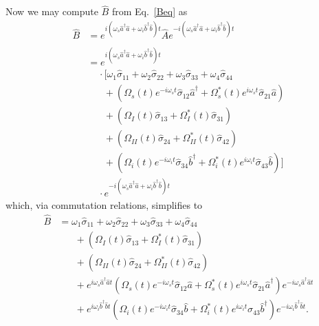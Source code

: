 \documentclass[aps,pra,showpacs,amsmath,amssymb,nofootinbib,longbibliography,superscriptaddress
]{revtex4-1}
\theoremstyle{definition}
\theoremstyle{remark}
\newcommand{\0}{\hat{0}}
\begin{document}
Now we may compute $\hat{B}$ from Eq.~\eqref{Beq} as
\begin{align}
    \hat{B}
    &=
    e^{i(\omega_s \hat{a}^{\dagger} \hat{a} + \omega_i \hat{b}^{\dagger} \hat{b})t}
    \hat{A}
    e^{-i(\omega_s \hat{a}^{\dagger} \hat{a} + \omega_i \hat{b}^{\dagger} \hat{b})t} \nonumber \\ \nonumber \\
    &=
    e^{i(\omega_s \hat{a}^{\dagger} \hat{a} + \omega_i \hat{b}^{\dagger} \hat{b})t} \nonumber\\
    &\;\;\;\;
    \cdot \biggl[
        \omega_1 \hat{\sigma}_{11} +
        \omega_2 \hat{\sigma}_{22} +
        \omega_3 \hat{\sigma}_{33} +
        \omega_4 \hat{\sigma}_{44} \nonumber \\
        &\;\;\;\;\;\;+
        \left(
            \Omega_{s}(t) e^{-i \omega_s t} \hat{\sigma}_{12} \hat{a}^{\dagger} +
            \Omega_{s}^*(t) e^{i \omega_s t} \hat{\sigma}_{21} \hat{a}
        \right)\nonumber \\
        &\;\;\;\;\;\;+
        \left(
            \Omega_{I}(t) \hat{\sigma}_{13} +
            \Omega_{I}^*(t) \hat{\sigma}_{31}
        \right)\nonumber \\
        &\;\;\;\;\;\;+
        \left(
            \Omega_{II}(t) \hat{\sigma}_{24} +
            \Omega_{II}^*(t) \hat{\sigma}_{42}
        \right)\nonumber \\
        &\;\;\;\;\;\;+
        \left(
            \Omega_{i}(t) e^{-i\omega_i t} \hat{\sigma}_{34} \hat{b}^{\dagger} +
            \Omega_{i}^*(t) e^{i\omega_i t} \hat{\sigma}_{43} \hat{b}
        \right)
    \biggr] \nonumber\\
    &\;\;\;\;\cdot
    e^{-i(\omega_s \hat{a}^{\dagger} \hat{a} + \omega_i \hat{b}^{\dagger} \hat{b})t}
\end{align}
which, via commutation relations, simplifies to 
\begin{align}\label{Unsimplified_B_eq}
    \hat{B}
    &=
    \omega_1 \hat{\sigma}_{11} +
    \omega_2 \hat{\sigma}_{22} +
    \omega_3 \hat{\sigma}_{33} +
    \omega_4 \hat{\sigma}_{44} \nonumber \\
    &\;\;\;\;\;\;+
    \left(
        \Omega_{I}(t) \hat{\sigma}_{13} +
        \Omega_{I}^*(t) \hat{\sigma}_{31}
    \right)\nonumber \\
    &\;\;\;\;\;\;+
    \left(
        \Omega_{II}(t) \hat{\sigma}_{24} +
        \Omega_{II}^*(t) \hat{\sigma}_{42}
    \right) \nonumber \\
    &\;\;\;\;\;\;+
    e^{i\omega_s \hat{a}^{\dagger} \hat{a}t}
    \left(
        \Omega_{s}(t) e^{-i \omega_s t} \hat{\sigma}_{12} \hat{a} +
        \Omega_{s}^*(t) e^{i \omega_s t} \hat{\sigma}_{21} \hat{a}^{\dagger}
    \right)
    e^{-i\omega_s \hat{a}^{\dagger} \hat{a}t}\nonumber \\
    &\;\;\;\;\;\;+
    e^{i \omega_i \hat{b}^{\dagger} \hat{b} t}
    \left(
        \Omega_{i}(t) e^{-i\omega_i t} \hat{\sigma}_{34} \hat{b} +
        \Omega_{i}^*(t) e^{i\omega_i t} \hat{\sigma}_{43} \hat{b}^{\dagger}
    \right) e^{-i \omega_i \hat{b}^{\dagger} \hat{b} t}.
\end{align}
\end{document}
